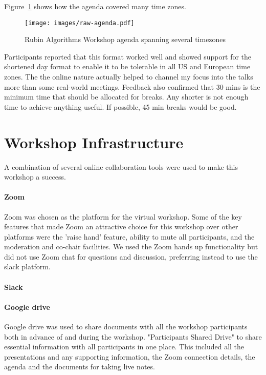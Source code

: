 \documentclass[DM,authoryear,toc]{lsstdoc}
\begin{document}
 Figure~\ref{fig:agenda} shows how the agenda covered many time zones.
\begin{figure}
\centering
\texttt{[image: images/raw-agenda.pdf]}
\caption{Rubin Algorithms Workshop agenda spanning several timezones}
\label{fig:agenda}
\end{figure}


Participants reported that this format worked well and showed support for the shortened day format to enable it to be tolerable in all US and European time zones. The the online nature actually helped to channel my focus into the talks more than some real-world meetings.
Feedback also confirmed that 30 mins is the minimum time that should be allocated for breaks. 
Any shorter is not enough time to achieve anything useful. 
If possible, 45 min breaks would be good. 

\section{Workshop Infrastructure} 
A combination of several online collaboration tools were used to make this workshop a success.

\paragraph{Zoom}
Zoom was chosen as the platform for the virtual workshop. 
Some of the key features that made Zoom an attractive choice for this workshop over other platforms were the 'raise hand' feature, ability to mute all participants, and the moderation and co-chair facilities.
We used the Zoom hands up functionality but did not use Zoom chat for questions and discussion, preferring instead to use the slack platform. 

\paragraph{Slack}


\paragraph{Google drive}
Google drive was used to share documents with all the workshop participants both in advance of and during the workshop.  
"Participants Shared Drive"  to share essential information with all participants in one place. 
This included all the presentations and any supporting information, the Zoom connection details, the agenda and the documents for taking live notes. 
\end{document}
